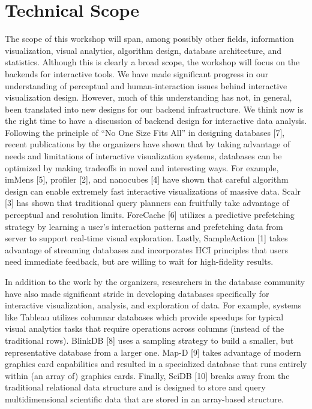 \documentclass[journal]{vgtc}                %
\begin{document}
\section{Technical Scope}
The scope of this workshop will span, among possibly other fields,
information visualization, visual analytics, algorithm design,
database architecture, and statistics. Although this is clearly a
broad scope, the workshop will focus on the backends for interactive
tools. We have made significant progress in our understanding of
perceptual and human-interaction issues behind interactive
visualization design. However, much of this understanding has not, in
general, been translated into new designs for our backend
infrastructure. We think now is the right time to have a discussion of
backend design for interactive data analysis. Following the principle
of ``No One Size Fits All'' in designing databases [7], recent
publications by the organizers have shown that by taking advantage of
needs and limitations of interactive visualization systems, databases
can be optimized by making tradeoffs in novel and interesting
ways. For example, imMens [5], profiler [2], and nanocubes [4] have
shown that careful algorithm design can enable extremely fast
interactive visualizations of massive data. Scalr [3] has shown that
traditional query planners can fruitfully take advantage of perceptual
and resolution limits. ForeCache [6] utilizes a predictive prefetching
strategy by learning a user’s interaction patterns and prefetching
data from server to support real-time visual exploration. Lastly,
SampleAction [1] takes advantage of streaming databases and
incorporates HCI principles that users need immediate feedback, but
are willing to wait for high-fidelity results.

In addition to the work by the organizers, researchers in the database
community have also made significant stride in developing databases
specifically for interactive visualization, analysis, and exploration
of data. For example, systems like Tableau utilizes columnar databases
which provide speedups for typical visual analytics tasks that require
operations across columns (instead of the traditional rows). BlinkDB
[8] uses a sampling strategy to build a smaller, but representative
database from a larger one. Map-D [9] takes advantage of modern
graphics card capabilities and resulted in a specialized database that
runs entirely within (an array of) graphics cards. Finally, SciDB [10]
breaks away from the traditional relational data structure and is
designed to store and query multidimensional scientific data that are
stored in an array-based structure.
\end{document}
